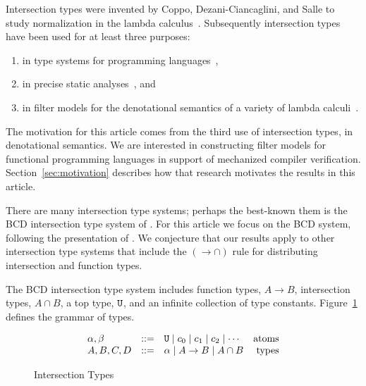 \documentclass{article}
\begin{document}
Intersection types were invented by Coppo, Dezani-Ciancaglini, and
Salle to study normalization in the lambda
calculus~\citep{Coppo:1979aa}. Subsequently intersection types have
been used for at least three purposes:
\begin{enumerate}
  \item in type systems for programming
    languages~\citep{Reynolds:1988aa,Pierce:1991aa,Castagna:2014aa,Chaudhuri:2014aa,Oliveira:2016aa,Amin:2017aa,Muehlboeck:2018aa,Bi:2019aa,Dunfield:2019aa,Microsoft:TypeScript2020aa,Dotty:2020aa},
  \item in precise static
    analyses~\citep{Turbak:1997aa,Palsberg:1998aa,Mossin:2003aa,Simoes:2007aa},
    and
  \item in filter models for the denotational semantics of a variety
    of lambda
    calculi~\citep{Coppo:1980ab,Coppo:1981aa,Coppo:1984aa,Honsell:1992aa,Abramsky:1993fk,Honsell:1999aa,Ishihara:2002aa,Rocca:2004aa,Dezani-Ciancaglini:2005aa,Alessi:2006aa,Barendregt:2013aa}.
\end{enumerate}
The motivation for this article comes from the third use of
intersection types, in denotational semantics.  We are interested in
constructing filter models for functional programming languages in
support of mechanized compiler
verification. Section~\ref{sec:motivation} describes how that research
motivates the results in this article.

There are many intersection type systems; perhaps the best-known them
is the BCD intersection type system of \citet{Barendregt:1983aa}. For
this article we focus on the BCD system, following the presentation of
\citet{Barendregt:2013aa}. We conjecture that our results apply to
other intersection type systems that include the $({\to}{\cap})$ rule
for distributing intersection and function types.

The BCD intersection type system includes function types, $A \to B$,
intersection types, $A \cap B$, a top type, $\mathtt{U}$, and an infinite
collection of type constants. Figure~\ref{fig:types} defines the
grammar of types.

\begin{figure}[tbp]
  \[
  \begin{array}{lclr}
    \alpha,\beta & ::= & \mathtt{U} \mid c_0 \mid c_1 \mid c_2 \mid \cdots & \text{atoms}\\
    A,B,C,D & ::= & \alpha \mid A \to B \mid A \cap B & \text{types}
  \end{array}
  \]
  \caption{Intersection Types}
  \label{fig:types}
\end{figure}
\end{document}
